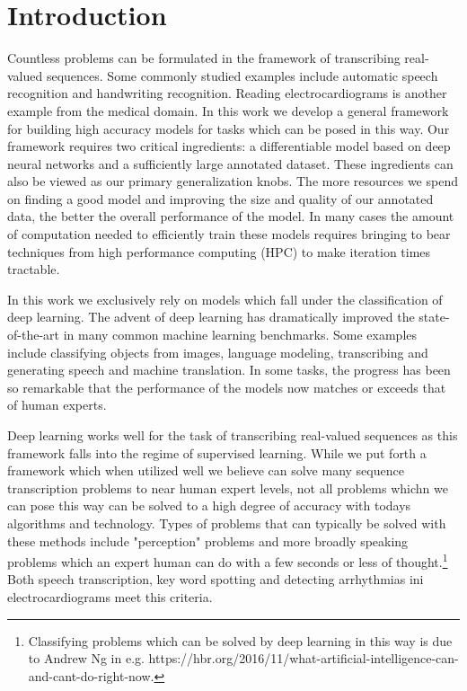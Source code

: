 \chapter{Introduction}

Countless problems can be formulated in the framework of transcribing
real-valued sequences. Some commonly studied examples include automatic speech
recognition and handwriting recognition. Reading electrocardiograms is another
example from the medical domain. In this work we develop a general framework
for building high accuracy models for tasks which can be posed in this way. Our
framework requires two critical ingredients: a differentiable model based on
deep neural networks and a sufficiently large annotated dataset. These
ingredients can also be viewed as our primary generalization knobs. The more
resources we spend on finding a good model and improving the size and quality
of our annotated data, the better the overall performance of the model. In many
cases the amount of computation needed to efficiently train these models
requires bringing to bear techniques from  high performance computing (HPC) to
make iteration times tractable.

In this work we exclusively rely on models which fall under the classification
of deep learning. The advent of deep learning has dramatically improved the
state-of-the-art in many common machine learning benchmarks. Some examples
include classifying objects from images, language modeling, transcribing and
generating speech and machine translation. In some tasks, the progress has been
so remarkable that the performance of the models now matches or exceeds that of
human experts.

Deep learning works well for the task of transcribing real-valued sequences as
this framework falls into the regime of supervised learning. While we put forth
a framework which when utilized well we believe can solve many sequence
transcription problems to near human expert levels, not all problems whichn we
can pose this way can be solved to a high degree of accuracy with todays
algorithms and technology. Types of problems that can typically be solved with
these methods include "perception" problems and more broadly speaking problems
which an expert human can do with a few seconds or less of
thought.\footnote{Classifying problems which can be solved by deep learning in
this way is due to Andrew Ng in e.g.
https://hbr.org/2016/11/what-artificial-intelligence-can-and-cant-do-right-now.}
Both speech transcription, key word spotting and detecting arrhythmias ini
electrocardiograms meet this criteria.

